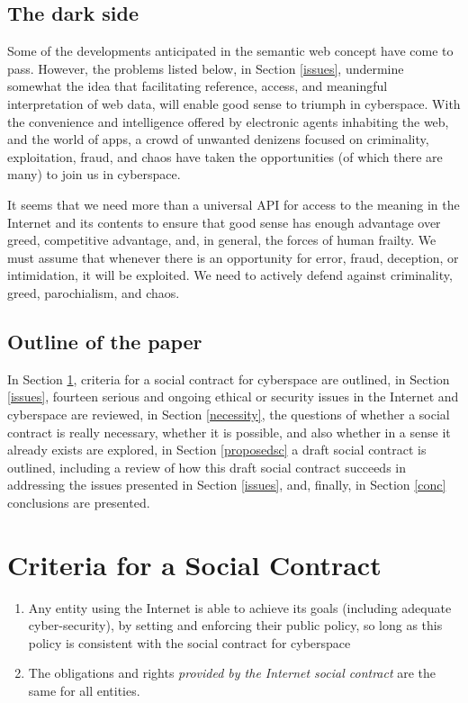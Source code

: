 \subsection{The dark side}

Some of the developments anticipated in the semantic web concept have come to pass. However, the problems listed below, in Section \ref{issues}, undermine somewhat the idea that facilitating reference, access, and meaningful interpretation of web data, will enable good sense to triumph in cyberspace. With the convenience and intelligence offered by electronic agents inhabiting the web, and the world of apps, a crowd of unwanted denizens focused on criminality, exploitation, fraud, and chaos have taken the opportunities (of which there are many) to join us in cyberspace.

It seems that we need more than a universal API for access to the meaning in the Internet and its contents to ensure that good sense has enough advantage over greed, competitive advantage, and, in general, the forces of human frailty. We must assume that whenever there is an opportunity for error, fraud, deception, or intimidation, it will be exploited. We need to actively defend against criminality, greed, parochialism, and chaos.

\subsection{Outline of the paper}

In Section \ref{criteria}, criteria for a social contract for cyberspace are outlined, in Section \ref{issues}, fourteen serious and ongoing ethical or security issues in the Internet and cyberspace are reviewed, in Section \ref{necessity}, the questions of whether a social contract is really necessary, whether it is possible, and also whether in a sense it already exists are explored, in Section \ref{proposedsc} a draft social contract is outlined, including a review of how this draft social contract succeeds in addressing the issues presented in Section \ref{issues}, and, finally, in Section \ref{conc} conclusions are presented.

\section{Criteria for a Social Contract}\label{criteria}

\begin{enumerate}[C-1.]

\item\label{canachieve} Any entity using the Internet is able to achieve its goals
	(including adequate cyber-security), by setting and enforcing
	their public policy, so long as this policy is consistent with
	the social contract for cyberspace

\item\label{sameforall} The obligations and rights {\em provided by the Internet social 
	contract} are the same for all entities.

\end{enumerate}

